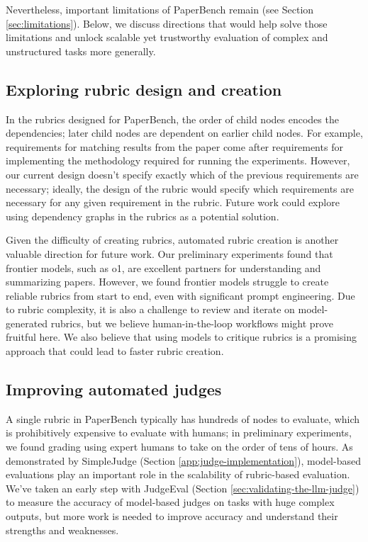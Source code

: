 \documentclass{article}
\theoremstyle{plain}
\theoremstyle{definition}
\theoremstyle{remark}
\begin{document}
Nevertheless, important limitations of PaperBench remain (see Section \ref{sec:limitations}). Below, we discuss directions that would help solve those limitations and unlock scalable yet trustworthy evaluation of complex and unstructured tasks more generally.

\subsection{Exploring rubric design and creation}
In the rubrics designed for PaperBench, the order of child nodes encodes the dependencies; later child nodes are dependent on earlier child nodes. For example, requirements for matching results from the paper come after requirements for implementing the methodology required for running the experiments. However, our current design doesn't specify exactly which of the previous requirements are necessary; ideally, the design of the rubric would specify which requirements are necessary for any given requirement in the rubric. Future work could explore using dependency graphs in the rubrics as a potential solution.

Given the difficulty of creating rubrics, automated rubric creation is another valuable direction for future work. Our preliminary experiments found that frontier models, such as o1, are excellent partners for understanding and summarizing papers. However, we found frontier models struggle to create reliable rubrics from start to end, even with significant prompt engineering. Due to rubric complexity, it is also a challenge to review and iterate on model-generated rubrics, but we believe human-in-the-loop workflows might prove fruitful here. We also believe that using models to critique rubrics is a promising approach that could lead to faster rubric creation.

\subsection{Improving automated judges} A single rubric in PaperBench typically has hundreds of nodes to evaluate, which is prohibitively expensive to evaluate with humans; in preliminary experiments, we found grading using expert humans to take on the order of tens of hours. As demonstrated by SimpleJudge (Section \ref{app:judge-implementation}), model-based evaluations \citep{chiang2023largelanguagemodelsalternative, lambert2024rewardbenchevaluatingrewardmodels, wang2024selftaughtevaluators} play an important role in the scalability of rubric-based evaluation. We've taken an early step with JudgeEval (Section \ref{sec:validating-the-llm-judge}) to measure the accuracy of model-based judges on tasks with huge complex outputs, but more work is needed to improve accuracy and understand their strengths and weaknesses.
\end{document}
